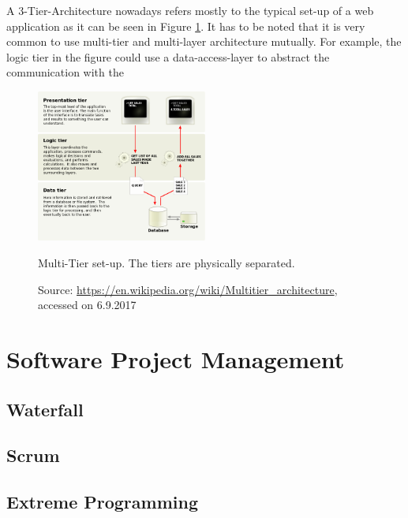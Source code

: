 A 3-Tier-Architecture nowadays refers mostly to the typical set-up of a web application as it can be seen in Figure \ref{fig:multi-tier}. It has to be noted that it is very common to use multi-tier and multi-layer architecture mutually. For example, the logic tier in the figure could use a data-access-layer to abstract the communication with the 

\begin{figure}[htbp]
	\centering
	\label{fig:multi-tier}
	\includegraphics[width=0.5\textwidth]{./content/pictures/multi-tier.jpg}
	\caption{Multi-Tier set-up. The tiers are physically separated.}
	\caption*{Source: \href{https://en.wikipedia.org/wiki/Multitier_architecture}{https://en.wikipedia.org/wiki/Multitier\_architecture}, accessed on 6.9.2017}
\end{figure}

\section{Software Project Management}
\subsection{Waterfall}
\subsection{Scrum}
\subsection{Extreme Programming}
\newpage
